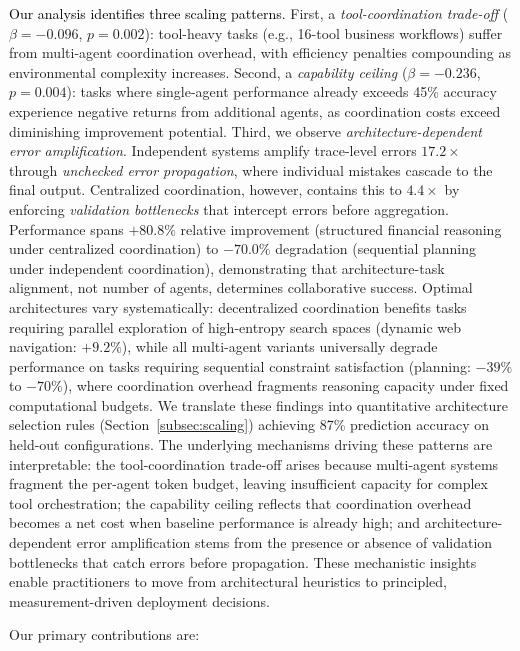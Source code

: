 \textcolor{black}{Our analysis identifies three scaling patterns.} First, a \textit{tool-coordination trade-off} ($\beta{=}{-}0.096$, $p{=}0.002$): tool-heavy tasks (e.g., 16-tool business workflows) suffer from multi-agent coordination overhead, with efficiency penalties compounding as environmental complexity increases. Second, a \textit{capability ceiling} ($\beta{=}{-}0.236$, $p{=}0.004$): tasks where single-agent performance already exceeds 45\% accuracy experience negative returns from additional agents, as coordination costs exceed diminishing improvement potential. 
Third, we observe \textit{architecture-dependent error amplification}. Independent systems amplify trace-level errors $17.2\times$ through \textit{unchecked error propagation}, where individual mistakes cascade to the final output. Centralized coordination, however, contains this to $4.4\times$ by enforcing \textit{validation bottlenecks} that intercept errors before aggregation. Performance spans ${+}80.8\%$ relative improvement (structured financial reasoning under centralized coordination) to ${-}70.0\%$ degradation (sequential planning under independent coordination), demonstrating that architecture-task alignment, not number of agents, determines collaborative success. Optimal architectures vary systematically: decentralized coordination benefits tasks requiring parallel exploration of high-entropy search spaces (dynamic web navigation: ${+}9.2\%$), while all multi-agent variants universally degrade performance on tasks requiring sequential constraint satisfaction (planning: ${-}39\%$ to ${-}70\%$), where coordination overhead fragments reasoning capacity under fixed computational budgets. We translate these findings into quantitative architecture selection 
rules (Section~\ref{subsec:scaling}) achieving 87\% prediction accuracy on held-out configurations. The underlying mechanisms driving these patterns are interpretable: the tool-coordination trade-off arises because multi-agent systems fragment the per-agent token budget, leaving insufficient capacity for complex tool orchestration; the capability 
ceiling reflects that coordination overhead becomes a net cost when 
baseline performance is already high; and architecture-dependent error amplification stems from the presence or absence of validation bottlenecks that catch errors before propagation. These mechanistic insights enable 
practitioners to move from architectural heuristics to principled, measurement-driven deployment decisions.

Our primary contributions are:

